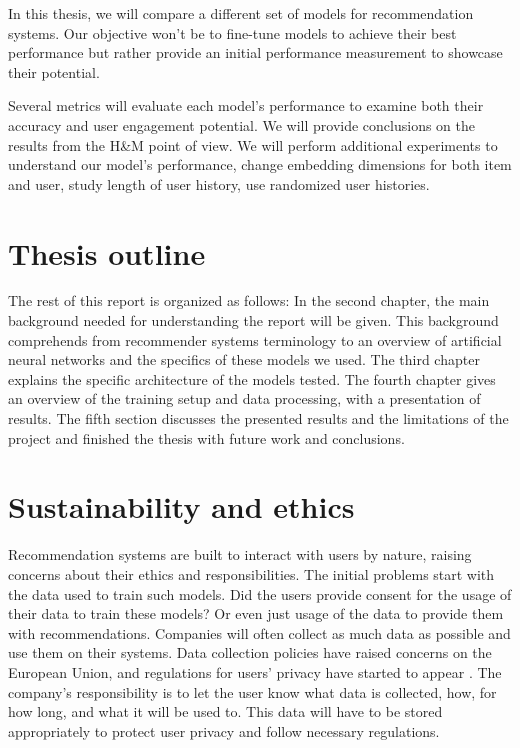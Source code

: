 \documentclass{kththesis}
\begin{document}
In this thesis, we will compare a different set of models for recommendation systems. Our objective won't be to fine-tune models to achieve their best performance but rather provide an initial performance measurement to showcase their potential.

Several metrics will evaluate each model's performance to examine both their accuracy and user engagement potential. We will provide conclusions on the results from the H\&M point of view. We will perform additional experiments to understand our model's performance, change embedding dimensions for both item and user, study length of user history, use randomized user histories.

\section{Thesis outline}
The rest of this report is organized as follows: In the second chapter, the main background needed for understanding the report will be given. This background comprehends from recommender systems terminology to an overview of artificial neural networks and the specifics of these models we used. The third chapter explains the specific architecture of the models tested. The fourth chapter gives an overview of the training setup and data processing, with a presentation of results. The fifth section discusses the presented results and the limitations of the project and finished the thesis with future work and conclusions.

\section{Sustainability and ethics}
Recommendation systems are built to interact with users by nature, raising concerns about their ethics and responsibilities. The initial problems start with the data used to train such models. Did the users provide consent for the usage of their data to train these models? Or even just usage of the data to provide them with recommendations. Companies will often collect as much data as possible and use them on their systems. Data collection policies have raised concerns on the European Union, and regulations for users' privacy have started to appear \cite{EUdataregulations2018}. The company's responsibility is to let the user know what data is collected, how, for how long, and what it will be used to. This data will have to be stored appropriately to protect user privacy and follow necessary regulations.
\end{document}

